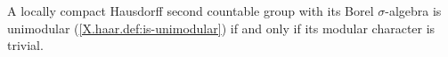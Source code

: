 A locally compact Hausdorff second countable group with its Borel $\sigma$-algebra is unimodular (\cref{X.haar.def:is-unimodular}) if and only if its modular character is trivial.
